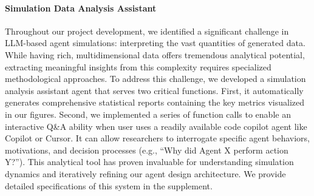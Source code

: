 \paragraph{Simulation Data Analysis Assistant}

Throughout our project development, we identified a significant challenge in LLM-based agent simulations: interpreting the vast quantities of generated data. While having rich, multidimensional data offers tremendous analytical potential, extracting meaningful insights from this complexity requires specialized methodological approaches. To address this challenge, we developed a simulation analysis assistant agent that serves two critical functions. First, it automatically generates comprehensive statistical reports containing the key metrics visualized in our figures. Second, we implemented a series of function calls to enable an interactive Q\&A ability when user uses a readily available code copilot agent like Copilot or Cursor. It can allow researchers to interrogate specific agent behaviors, motivations, and decision processes (e.g., ``Why did Agent X perform action Y?''). This analytical tool has proven invaluable for understanding simulation dynamics and iteratively refining our agent design architecture. We provide detailed specifications of this system in the supplement.